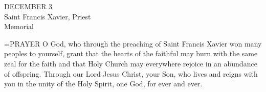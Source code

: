 \begin{center}\normalsize DECEMBER 3\\
\footnotesize Saint Francis Xavier, Priest\\
\footnotesize Memorial\\
\end{center}

\hangindent=\parindent \small{PRAYER 
O God, who through the preaching of Saint Francis Xavier
won many peoples to yourself,
grant that the hearts of the faithful
may burn with the same zeal for the faith
and that Holy Church may everywhere rejoice
in an abundance of offspring.
Through our Lord Jesus Christ, your Son,
who lives and reigns with you in the unity of the Holy Spirit,
one God, for ever and ever.\\}
 

